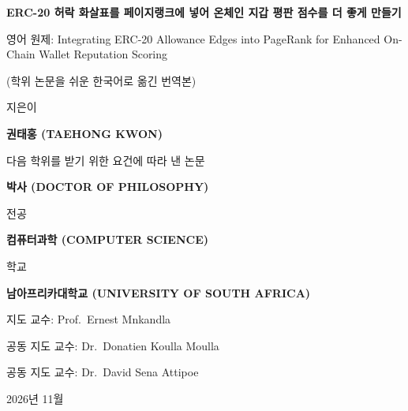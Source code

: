 \begin{titlepage}
\centering
\vspace*{0.4cm}
{\Large\bfseries ERC-20 허락 화살표를 페이지랭크에 넣어 온체인 지갑 평판 점수를 더 좋게 만들기\par}
\vspace{0.5cm}
{\small 영어 원제: Integrating ERC-20 Allowance Edges into PageRank for Enhanced On-Chain Wallet Reputation Scoring\par}
\vspace{0.3cm}
{\small (학위 논문을 쉬운 한국어로 옮긴 번역본)\par}
\vfill
{지은이\par}
\vspace{0.7cm}
{\large\bfseries 권태홍 (TAEHONG KWON)\par}
\vfill
{다음 학위를 받기 위한 요건에 따라 낸 논문\par}
\vspace{0.7cm}
{\large\bfseries 박사 (DOCTOR OF PHILOSOPHY)\par}
\vspace{0.35cm}
{전공\par}
\vspace{0.7cm}
{\large\bfseries 컴퓨터과학 (COMPUTER SCIENCE)\par}
\vfill
{학교\par}
\vspace{0.7cm}
{\large\bfseries 남아프리카대학교 (UNIVERSITY OF SOUTH AFRICA)\par}
\vfill
{지도 교수: Prof.~Ernest Mnkandla\par}
\vspace{0.35cm}
{공동 지도 교수: Dr.~Donatien Koulla Moulla\par}
\vspace{0.35cm}
{공동 지도 교수: Dr.~David Sena Attipoe\par}
\vfill
{2026년 11월\par}
\end{titlepage}
\restoregeometry
